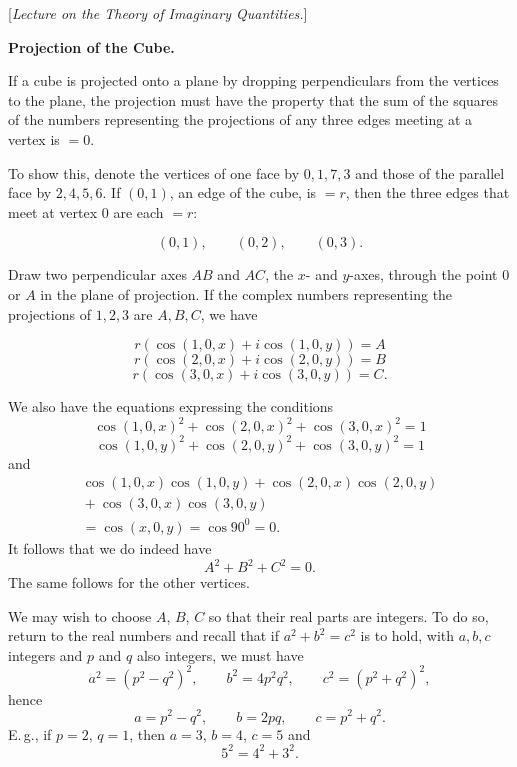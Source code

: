 \clearpage{}

\begin{center}[\emph{Lecture on the Theory of Imaginary Quantities.}]\end{center}

\begin{center}\bfseries Projection of the Cube.\end{center}

If a cube is projected onto a plane by dropping perpendiculars from the vertices to the plane, the projection must have the property that the sum of the squares of the numbers representing the projections of any three edges meeting at a vertex is $=0$.

To show this, denote the vertices of one face by $0,1,7,3$ and those of the parallel face by $2,4,5,6$. If $(0,1)$, an edge of the cube, is $=r$, then the three edges that meet at vertex $0$ are each $=r$:

\begin{center}\end{center}

\[
(0,1),\qquad (0,2),\qquad (0,3).
\]

Draw two perpendicular axes $AB$ and $AC$, the $x$- and $y$-axes, through the point $0$ or $A$ in the plane of projection. If the complex numbers representing the projections of $1,2,3$ are $A,B,C$, we have

\begin{center}\begin{minipage}{5.2cm}\end{minipage}\hspace{.3cm}\begin{minipage}{7.2cm}

\[
r(\cos(1,0,x)+i\cos(1,0,y)) = A
\]
\[
r(\cos(2,0,x)+i\cos(2,0,y)) = B
\]
\[
r(\cos(3,0,x)+i\cos(3,0,y)) = C.
\]
\end{minipage}\end{center}
We also have the equations expressing the conditions
\[
\cos(1,0,x)^2+\cos(2,0,x)^2+\cos(3,0,x)^2 = 1
\]
\[
\cos(1,0,y)^2+\cos(2,0,y)^2+\cos(3,0,y)^2 = 1
\]
and
\[
\begin{gathered}\cos(1,0,x)\cos(1,0,y)+\cos(2,0,x)\cos(2,0,y)\\{}+\cos(3,0,x)\cos(3,0,y)\\{}=\cos(x,0,y)=\cos 90^0=0.\end{gathered}
\]
It follows that we do indeed have
\[
A^2+B^2+C^2=0.
\]
The same follows for the other vertices.

We may wish to choose $A$, $B$, $C$ so that their real parts are integers. To do so, return to the real numbers and recall that if $a^2+b^2=c^2$ is to hold, with $a,b,c$ integers and $p$ and $q$ also integers, we must have
\[
a^2=(p^2-q^2)^2,\qquad b^2=4p^2q^2,\qquad c^2=(p^2+q^2)^2,
\]
hence
\[
a=p^2-q^2,\qquad b=2pq,\qquad c=p^2+q^2.
\]
E.\,g., if $p=2$, $q=1$, then $a=3$, $b=4$, $c=5$ and
\[
5^2=4^2+3^2.
\]
